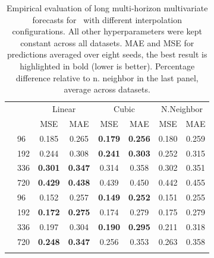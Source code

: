 \begin{table}[ht!] %
\scriptsize
    \begin{center}
    \caption{Empirical evaluation of long multi-horizon multivariate forecasts for \ours\ with different interpolation configurations. All other hyperparameters were kept constant across all datasets. MAE and MSE for predictions averaged over eight seeds, the best result is highlighted in bold (lower is better). Percentage difference relative to n. neighbor in the last panel, average across datasets.}
    \label{table:ablation_interpolation}    
	\begin{tabular}{ll | cccccc} \toprule
    						        &     & \multicolumn{2}{c}{Linear}          & \multicolumn{2}{c}{Cubic}         & \multicolumn{2}{c}{N.Neighbor}  \\
    						        &     & MSE              & MAE              & MSE             & MAE             & MSE            & MAE            \\ \midrule
\parbox[t]{1mm}{}    						        
									& 96  & 0.185            & 0.265            & \textbf{0.179}  & \textbf{0.256}  & 0.180          & 0.259          \\
									& 192 & 0.244            & 0.308            & \textbf{0.241}  & \textbf{0.303}  & 0.252          & 0.315          \\
									& 336 & \textbf{0.301}   & \textbf{0.347}   & 0.314           &  0.358          & 0.302          & 0.351          \\
									& 720 & \textbf{0.429}   & \textbf{0.438}   & 0.439           &  0.450          & 0.442          & 0.455          \\ \midrule
\parbox[t]{1mm}{}
									& 96  & 0.152            & 0.257            & \textbf{0.149}  & \textbf{0.252}  & 0.151          & 0.255          \\
									& 192 & \textbf{0.172}   & \textbf{0.275}   & 0.174           &  0.279          & 0.175          & 0.279          \\
									& 336 & 0.197            & 0.304            & \textbf{0.190}  &  \textbf{0.295} & 0.211          & 0.318          \\
									& 720 & \textbf{0.248}   & \textbf{0.347}   & 0.256           &  0.353          & 0.263          & 0.358          \\ \midrule
\parbox[t]{1mm}{}

\end{tabular}
\end{center}
\end{table}
